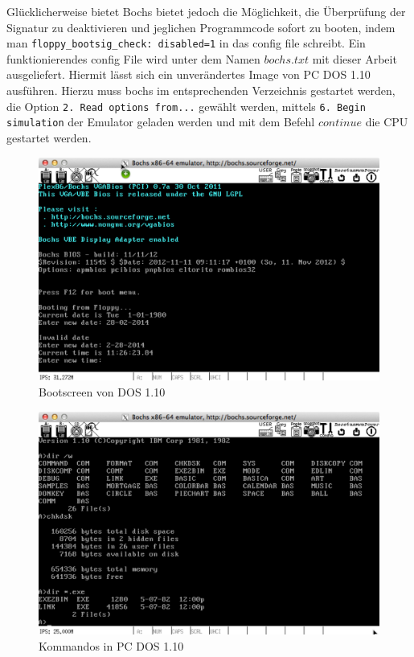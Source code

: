 	Glücklicherweise bietet Bochs bietet jedoch die Möglichkeit, die Überprüfung der Signatur zu deaktivieren und jeglichen Programmcode sofort zu booten, indem man \lstinline{floppy_bootsig_check: disabled=1} in das config file schreibt.
	Ein funktionierendes config File wird unter dem Namen $bochs.txt$ mit dieser Arbeit ausgeliefert.
	Hiermit lässt sich ein unverändertes Image von PC DOS 1.10 ausführen.
	Hierzu muss bochs im entsprechenden Verzeichnis gestartet werden, die Option \lstinline{2. Read options from...} gewählt werden, mittels \lstinline{6. Begin simulation} der Emulator geladen werden und mit dem Befehl $continue$ die CPU gestartet werden.

	\begin{figure}[p]
		\begin{center}
			\includegraphics[width=\textwidth]{img/DOS110_1}
			\caption{Bootscreen von DOS 1.10}
			\label{fig:screenshot-dos110boot}
		\end{center}
	\end{figure}

	\begin{figure}[p]
		\begin{center}
			\includegraphics[width=\textwidth]{img/DOS110_2}
			\caption{Kommandos in PC DOS 1.10}
			\label{fig:screenshot-dos110commands}
		\end{center}
	\end{figure}

